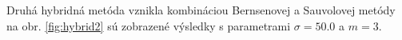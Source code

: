 \documentclass[a4paper,11pt,oneside]{article}%
\begin{document}
Druhá hybridná metóda vznikla kombináciou Bernsenovej a Sauvolovej metódy na obr. \ref{fig:hybrid2}  sú zobrazené výsledky s parametrami $\sigma = 50.0$ a $m = 3$.

\begin{figure}[H]  
    \hspace{5px}

\end{figure}
\end{document}
